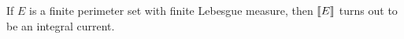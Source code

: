 \documentclass[a4paper,11pt]{article}
\numberwithin{equation}{section}
\newcommand{\jump}[1]{\text{{\rm \textlbrackdbl}}{#1}\text{{\rm \textrbrackdbl}}}
\newcommand{\R}{\mathbb{R}}
\newcommand{\res}      {\mathop{\hbox{\vrule height 7pt width .5pt depth
                        0pt\vrule height .5pt width 6pt depth 0pt}}\nolimits}
\begin{document}
%
%
%
If $E$ is a finite perimeter set with finite Lebesgue measure, then $\jump{E}$ turns out to be an integral current.
\medskip
\end{document}
